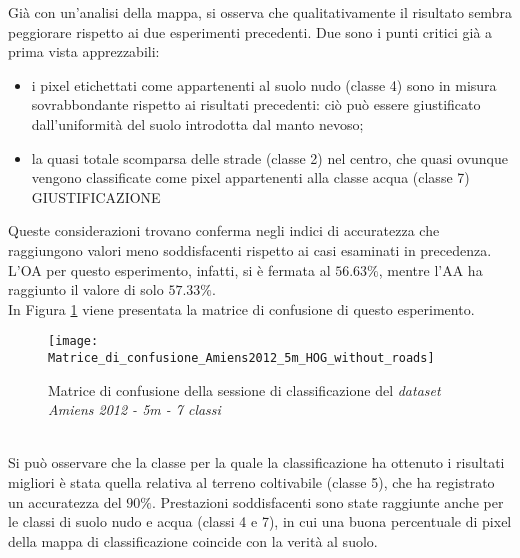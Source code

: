 Già con un'analisi della mappa, si osserva che qualitativamente il risultato sembra peggiorare rispetto ai due esperimenti precedenti. Due sono i punti critici già a prima vista apprezzabili:
\begin{itemize}
\item i pixel etichettati come appartenenti al suolo nudo (classe 4) sono in misura sovrabbondante rispetto ai risultati precedenti: ciò può essere giustificato dall'uniformità del suolo introdotta dal manto nevoso;
\item la quasi totale scomparsa delle strade (classe 2) nel centro, che quasi ovunque vengono classificate come pixel appartenenti alla classe acqua (classe 7) GIUSTIFICAZIONE
\end{itemize}

Queste considerazioni trovano conferma  negli indici di accuratezza  che raggiungono valori meno soddisfacenti rispetto ai casi esaminati in precedenza.
L'OA per questo esperimento, infatti, si è fermata al $56.63\%$, mentre l'AA ha raggiunto il valore di  solo $57.33\%$.\\
 In Figura \ref{fig:Matrice_di_confusione_Amiens2012_5m_HOG_without_roads} viene presentata la matrice di confusione di questo esperimento.
\\
\begin{figure}[!ht]
\texttt{[image: Matrice\_di\_confusione\_Amiens2012\_5m\_HOG\_without\_roads]}
\caption{Matrice di confusione della sessione di classificazione del \emph{dataset} \emph{Amiens 2012 - 5m - 7 classi}}
\label{fig:Matrice_di_confusione_Amiens2012_5m_HOG_without_roads}
\end{figure}
\
\\
Si può osservare che la classe per la quale la classificazione ha ottenuto i risultati migliori è stata quella relativa al terreno coltivabile (classe 5), che ha registrato un accuratezza del $90\%$. Prestazioni soddisfacenti sono state raggiunte anche per le classi di suolo nudo e acqua (classi 4 e 7), in cui una buona percentuale di pixel della mappa di classificazione coincide con la verità al suolo.\\

%      


